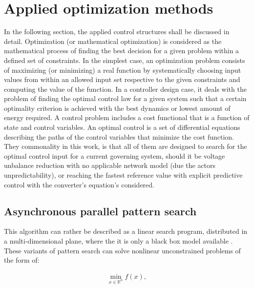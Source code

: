 \section{Applied optimization methods}

In the following section, the applied control structures shall be discussed in detail. Optimization (or mathematical optimization) is considered as the mathematical process of finding the best decision for a given problem within a defined set of constraints. In the simplest case, an optimization problem consists of maximizing (or minimizing) a real function by systematically choosing input values from within an allowed input set respective to the given constraints and computing the value of the function. In a controller design case, it deals with the problem of finding the optimal control law for a given system such that a certain optimality criterion is achieved with the best dynamics or lowest amount of energy required. A control problem includes a cost functional that is a function of state and control variables. An optimal control is a set of differential equations describing the paths of the control variables that minimize the cost function. They commonality in this work, is that all of them are designed to search for the optimal control input for a current governing system, should it be voltage unbalance reduction with no applicable network model (due the actors unpredictability), or reaching the fastest reference value with explicit predictive control with the converter's equation's considered.

\subsection{Asynchronous parallel pattern search}\label{BASICUNB:sec:APPS}

This algorithm can rather be described as a linear search program, distributed in a multi-dimensional plane, where the it is only a black box model available \cite{kolda2003understanding}. These variants of pattern search can solve nonlinear unconstrained problems of the form of:

\begin{equation}
        \begin{array}{c}
            \min_{x\in\mathbb{R}^n}f(x),\\
        \end{array}
        \label{BASICCSR:eqn:currents}
    \end{equation}
		
